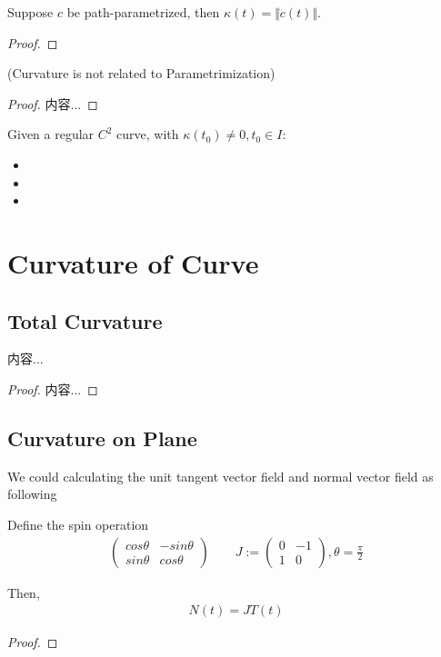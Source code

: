 \documentclass[Total.tex]{subfiles}
\begin{document}
			\begin{corollary}
				Suppose $c$ be path-parametrized, then $\kappa(t)=\Vert \ddot{c}(t)\Vert$.
			\end{corollary}
			\begin{proof}
				
			\end{proof}
			
			\begin{proposition}
				(Curvature is not related to Parametrimization)
			\end{proposition}
			\begin{proof}
				内容...
			\end{proof}
			
			\begin{Def}
				Given a regular $C^2$ curve, with $\kappa(t_0)\not=0,t_0\in I$:
				\begin{itemize}
					\item 
					\item 
					\item 
				\end{itemize}
			\end{Def}
			
			
		\section{Curvature of Curve}
			\subsection{Total Curvature}
				\begin{lemma}
					内容...
				\end{lemma}
				\begin{proof}
					内容...
				\end{proof}
			\subsection{Curvature on Plane}
				\begin{proposition}
					We could calculating the unit tangent vector field and normal vector field as following
					\begin{Def}
						Define the spin operation 
						\begin{gather*}
							\begin{pmatrix}
								cos\theta&-sin\theta\\
								sin\theta&cos\theta
							\end{pmatrix}\qquad J:=\begin{pmatrix}
								0&-1\\
								1&0
							\end{pmatrix},\theta=\frac{\pi}{2}
						\end{gather*}
					\end{Def}
					
					Then, 
					\begin{gather*}
						N(t)=JT(t)
					\end{gather*}
				\end{proposition}
				\begin{proof}
				\end{proof}
				
\end{document}
